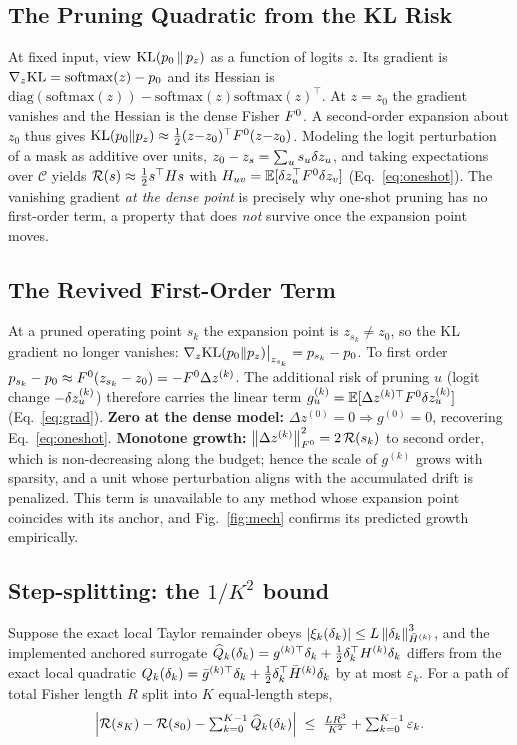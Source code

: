 \subsection{The Pruning Quadratic from the KL Risk}
\label{app:quad}
At fixed input, view $\mathrm{KL}(p_0\,\|\,p_z)$ as a function of logits $z$. Its gradient is
$\nabla_z\mathrm{KL}=\mathrm{softmax}(z)-p_0$ and its Hessian is $\mathrm{diag}(\mathrm{softmax}(z))-
\mathrm{softmax}(z)\mathrm{softmax}(z)^\top$. At $z{=}z_0$ the gradient vanishes and the Hessian is the
dense Fisher $F^0$. A second-order expansion about $z_0$ thus gives
$\mathrm{KL}(p_0\|p_z)\approx\tfrac12(z{-}z_0)^\top F^0(z{-}z_0)$. Modeling the logit perturbation of a
mask as additive over units, $z_0-z_s=\sum_u s_u\delta z_u$, and taking expectations over $\mathcal{C}$
yields $\mathcal{R}(s)\approx\tfrac12 s^\top H s$ with $H_{uv}=\mathbb{E}[\delta z_u^\top F^0\delta z_v]$
(Eq.~\ref{eq:oneshot}). The vanishing gradient \emph{at the dense point} is precisely why one-shot
pruning has no first-order term, a property that does \emph{not} survive once the expansion point
moves.

\subsection{The Revived First-Order Term}
\label{app:firstorder}
At a pruned operating point $s_k$ the expansion point is $z_{s_k}\!\neq\!z_0$, so the KL gradient no
longer vanishes: $\nabla_z\mathrm{KL}(p_0\|p_z)\big|_{z_{s_k}}=p_{s_k}-p_0$. To first order
$p_{s_k}-p_0\approx F^0(z_{s_k}-z_0)=-F^0\Delta z^{(k)}$. The additional risk of pruning
$u$ (logit change $-\delta z_u^{(k)}$) therefore carries the linear term
$g^{(k)}_u=\mathbb{E}[\Delta z^{(k)\top}F^0\delta z^{(k)}_u]$ (Eq.~\ref{eq:grad}).
\textbf{Zero at the dense model:} $\Delta z^{(0)}{=}0\Rightarrow g^{(0)}{=}0$, recovering
Eq.~\eqref{eq:oneshot}. \textbf{Monotone growth:} $\left\lVert \Delta z^{(k)} \right\rVert_{F^0}^2=2\,\mathcal{R}(s_k)$
to second order, which is non-decreasing along the budget; hence the scale of $g^{(k)}$ grows with
sparsity, and a unit whose perturbation aligns with the accumulated drift is penalized. This term is
unavailable to any method whose expansion point coincides with its anchor, and Fig.~\ref{fig:mech}
confirms its predicted growth empirically.

\subsection{Step-splitting: the $1/K^2$ bound}
\label{app:proof}
\begin{proposition}\label{prop:k2}
Suppose the exact local Taylor remainder obeys $|\xi_k(\delta_k)|\le L\left\lVert \delta_k \right\rVert_{\bar{H}^{(k)}}^3$,
and the implemented anchored surrogate $\widehat Q_k(\delta_k)=g^{(k)\top}\delta_k+\tfrac12\delta_k^\top H^{(k)}\delta_k$
differs from the exact local quadratic $Q_k(\delta_k)=\bar g^{(k)\top}\delta_k+\tfrac12\delta_k^\top\bar{H}^{(k)}\delta_k$
by at most $\varepsilon_k$. For a path of total Fisher length $R$ split into $K$ equal-length steps,
\[
\Big|\mathcal{R}(s_K)-\mathcal{R}(s_0)-\textstyle\sum_{k=0}^{K-1}\widehat Q_k(\delta_k)\Big|\;\le\;\frac{LR^3}{K^2}+\sum_{k=0}^{K-1}\varepsilon_k.
\]
\end{proposition}

